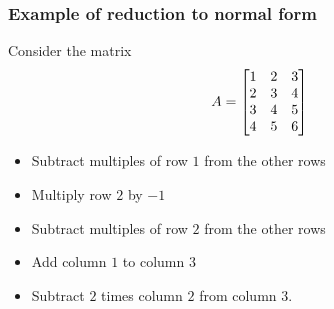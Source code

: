 \documentclass[9pt]{beamer}
\begin{document}
\begin{frame}[t]
 \frametitle{Example of reduction to normal form}

  Consider the matrix
  \[ A = \left[\begin{matrix} 1&2&3 \\ 2&3&4 \\ 3&4&5 \\ 4&5&6 \end{matrix}\right] \]

  \begin{itemize}
   \item<2-> Subtract multiples of row $1$ from the other rows
   \item<3-> Multiply row $2$ by $-1$
   \item<4-> Subtract multiples of row $2$ from the other rows
   \item<5-> Add column $1$ to column $3$
   \item<6-> Subtract $2$ times column $2$ from column $3$.
  \end{itemize}

\end{frame}
\end{document}
